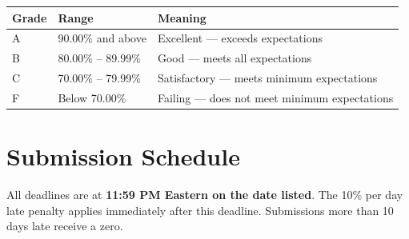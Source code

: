 \documentclass[
  10pt,
]{article}
\begin{document}
\begin{longtable}[]{@{}lll@{}}
\toprule\noalign{}
Grade & Range & Meaning \\
\midrule\noalign{}
\endhead
\bottomrule\noalign{}
\endlastfoot
A & 90.00\% and above & Excellent --- exceeds expectations \\
B & 80.00\% -- 89.99\% & Good --- meets all expectations \\
C & 70.00\% -- 79.99\% & Satisfactory --- meets minimum expectations \\
F & Below 70.00\% & Failing --- does not meet minimum expectations \\
\end{longtable}

\section*{Submission Schedule}\label{submission-schedule}

All deadlines are at \textbf{11:59 PM Eastern on the date listed}. The
10\% per day late penalty applies immediately after this deadline.
Submissions more than 10 days late receive a zero.

\begingroup\fontsize{9}{11}\selectfont
\end{document}
